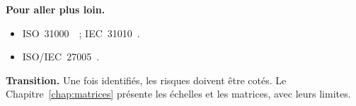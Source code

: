 \bigskip

\begin{boxinfo}
\textbf{Pour aller plus loin.}
\begin{itemize}
    \item ISO~31000~\cite{iso31000_2018}~; IEC~31010~\cite{iec31010}.
    \item ISO/IEC~27005~\cite{iso27005_2022}.
\end{itemize}
\end{boxinfo}

\begin{boxinfo}
\textbf{Transition.} Une fois identifiés, les risques doivent être cotés.
Le Chapitre~\ref{chap:matrices} présente les échelles et les matrices,
avec leurs limites.
\end{boxinfo}

